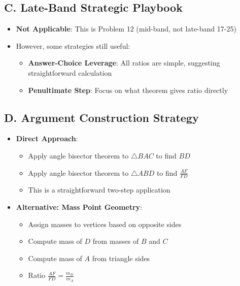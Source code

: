 \documentclass[12pt]{article}
\begin{document}
\begin{strategicbox}
\subsection*{C. Late-Band Strategic Playbook}
\begin{itemize}[leftmargin=*]
    \item \textbf{Not Applicable}: This is Problem 12 (mid-band, not late-band 17-25)
    \item However, some strategies still useful:
    \begin{itemize}
        \item \textbf{Answer-Choice Leverage}: All ratios are simple, suggesting straightforward calculation
        \item \textbf{Penultimate Step}: Focus on what theorem gives ratio directly
    \end{itemize}
\end{itemize}

\subsection*{D. Argument Construction Strategy}
\begin{itemize}[leftmargin=*]
    \item \textbf{Direct Approach}: 
    \begin{itemize}
        \item Apply angle bisector theorem to $\triangle BAC$ to find $BD$
        \item Apply angle bisector theorem to $\triangle ABD$ to find $\frac{AF}{FD}$
        \item This is a straightforward two-step application
    \end{itemize}
    
    \item \textbf{Alternative: Mass Point Geometry}:
    \begin{itemize}
        \item Assign masses to vertices based on opposite sides
        \item Compute mass of $D$ from masses of $B$ and $C$
        \item Compute mass of $A$ from triangle sides
        \item Ratio $\frac{AF}{FD} = \frac{m_D}{m_A}$
    \end{itemize}
\end{itemize}
\end{strategicbox}
\end{document}
